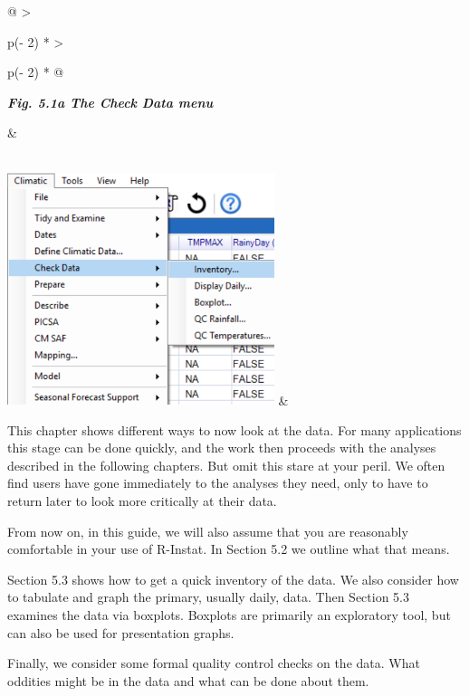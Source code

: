 \documentclass[
  letterpaper,
  DIV=11,
  numbers=noendperiod]{scrreprt}
\begin{document}
\begin{longtable}[]{@{}
  >{\raggedright\arraybackslash}p{(\columnwidth - 2\tabcolsep) * }
  >{\raggedright\arraybackslash}p{(\columnwidth - 2\tabcolsep) * }@{}}
\toprule\noalign{}
\begin{minipage}[b]{\linewidth}\raggedright
\textbf{\emph{Fig. 5.1a The Check Data menu}}
\end{minipage} & \begin{minipage}[b]{\linewidth}\raggedright
\end{minipage} \\
\midrule\noalign{}
\endhead
\bottomrule\noalign{}
\endlastfoot
\includegraphics[width=3.07127in,height=2.67218in]{figures/Fig5.1a.png}
& \\
\end{longtable}

This chapter shows different ways to now look at the data. For many
applications this stage can be done quickly, and the work then proceeds
with the analyses described in the following chapters. But omit this
stare at your peril. We often find users have gone immediately to the
analyses they need, only to have to return later to look more critically
at their data.

From now on, in this guide, we will also assume that you are reasonably
comfortable in your use of R-Instat. In Section 5.2 we outline what that
means.

Section 5.3 shows how to get a quick inventory of the data. We also
consider how to tabulate and graph the primary, usually daily, data.
Then Section 5.3 examines the data via boxplots. Boxplots are primarily
an exploratory tool, but can also be used for presentation graphs.

Finally, we consider some formal quality control checks on the data.
What oddities might be in the data and what can be done about them.
\end{document}
